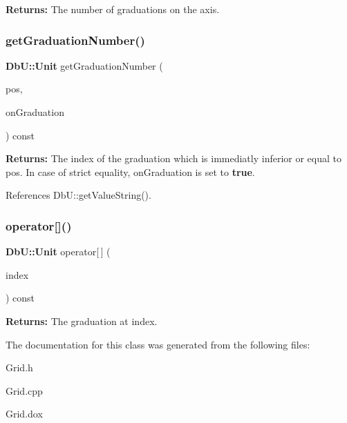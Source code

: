 {\bfseries Returns\+:} The number of graduations on the axis. \mbox{\label{classKatabatic_1_1BaseGrid_1_1Axis_a2a6bd524227130d8ccf482aa2c484a42}} 
\subsubsection{\texorpdfstring{get\+Graduation\+Number()}{getGraduationNumber()}}
{\footnotesize\ttfamily \textbf{ Db\+U\+::\+Unit} get\+Graduation\+Number (\begin{DoxyParamCaption}\item[{\textbf{ Db\+U\+::\+Unit}}]{pos,  }\item[{bool \&}]{on\+Graduation }\end{DoxyParamCaption}) const}

{\bfseries Returns\+:} The index of the graduation which is immediatly inferior or equal to {\ttfamily pos}. In case of strict equality, {\ttfamily on\+Graduation} is set to {\bfseries true}. 

References Db\+U\+::get\+Value\+String().

\mbox{\label{classKatabatic_1_1BaseGrid_1_1Axis_a074a4f61306b88baac6bbf54b0b3212c}} 
\subsubsection{\texorpdfstring{operator[]()}{operator[]()}}
{\footnotesize\ttfamily \textbf{ Db\+U\+::\+Unit} operator\mbox{[}$\,$\mbox{]} (\begin{DoxyParamCaption}\item[{unsigned int}]{index }\end{DoxyParamCaption}) const\hspace{0.3cm}{\ttfamily [inline]}}

{\bfseries Returns\+:} The graduation at {\ttfamily index}. 

The documentation for this class was generated from the following files\+:\begin{DoxyCompactItemize}
\item 
Grid.\+h\item 
Grid.\+cpp\item 
Grid.\+dox\end{DoxyCompactItemize}
